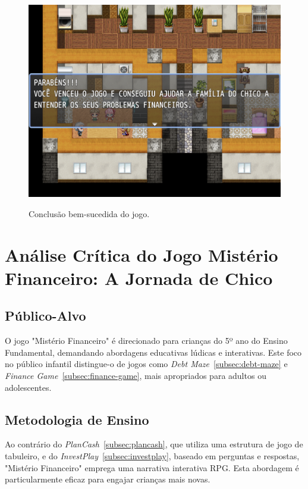 \begin{figure}[!htbp]
	\centering
	\caption{Conclusão bem-sucedida do jogo.}
	\includegraphics[scale=0.4]{Textuais/Pictures/vitoria.png}
	\label{fig:vitoria}
\end{figure}

\section{Análise Crítica do Jogo Mistério Financeiro: A Jornada de Chico}

\subsection*{Público-Alvo}
O jogo "Mistério Financeiro" é direcionado para crianças do 5º ano do Ensino Fundamental, demandando abordagens educativas lúdicas e interativas. Este foco no público infantil distingue-o de jogos como \textit{Debt Maze}~\ref{subsec:debt-maze} e \textit{Finance Game}~\ref{subsec:finance-game}, mais apropriados para adultos ou adolescentes.

\subsection*{Metodologia de Ensino}
Ao contrário do \textit{PlanCash}~\ref{subsec:plancash}, que utiliza uma estrutura de jogo de tabuleiro, e do \textit{InvestPlay}~\ref{subsec:investplay}, baseado em perguntas e respostas, "Mistério Financeiro" emprega uma narrativa interativa RPG. Esta abordagem é particularmente eficaz para engajar crianças mais novas.

